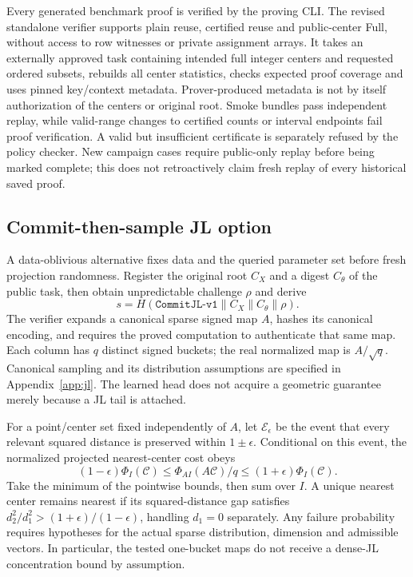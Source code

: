 Every generated benchmark proof is verified by the proving CLI. The revised standalone verifier supports plain reuse, certified reuse and public-center Full, without access to row witnesses or private assignment arrays. It takes an externally approved task containing intended full integer centers and requested ordered subsets, rebuilds all center statistics, checks expected proof coverage and uses pinned key/context metadata. Prover-produced metadata is not by itself authorization of the centers or original root. Smoke bundles pass independent replay, while valid-range changes to certified counts or interval endpoints fail proof verification. A valid but insufficient certificate is separately refused by the policy checker. New campaign cases require public-only replay before being marked complete; this does not retroactively claim fresh replay of every historical saved proof.

\subsection{Commit-then-sample JL option}\label{sec:theory}
A data-oblivious alternative fixes data and the queried parameter set before fresh projection randomness. Register the original root $C_X$ and a digest $C_\theta$ of the public task, then obtain unpredictable challenge $\rho$ and derive
\begin{equation}
s=H(\texttt{CommitJL-v1}\|C_X\|C_\theta\|\rho).
\end{equation}
The verifier expands a canonical sparse signed map $A$, hashes its canonical encoding, and requires the proved computation to authenticate that same map. Each column has $q$ distinct signed buckets; the real normalized map is $A/\sqrt q$. Canonical sampling and its distribution assumptions are specified in Appendix~\ref{app:jl}. The learned head does not acquire a geometric guarantee merely because a JL tail is attached.

For a point/center set fixed independently of $A$, let $\mathcal E_\epsilon$ be the event that every relevant squared distance is preserved within $1\pm\epsilon$. Conditional on this event, the normalized projected nearest-center cost obeys
\begin{equation}
(1-\epsilon)\Phi_I(\mathcal C)\le
\Phi_{AI}(A\mathcal C)/q\le(1+\epsilon)\Phi_I(\mathcal C).
\end{equation}
Take the minimum of the pointwise bounds, then sum over $I$. A unique nearest center remains nearest if its squared-distance gap satisfies $d_2^2/d_1^2>(1+\epsilon)/(1-\epsilon)$, handling $d_1=0$ separately. Any failure probability requires hypotheses for the actual sparse distribution, dimension and admissible vectors. In particular, the tested one-bucket maps do not receive a dense-JL concentration bound by assumption.

